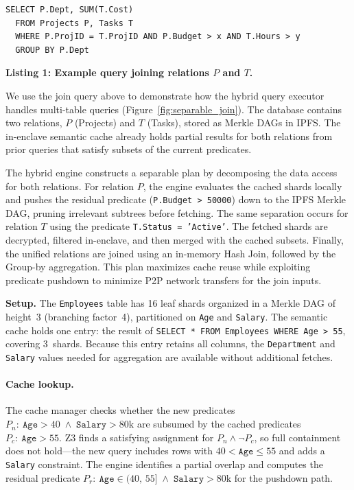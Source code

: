 \begin{lstlisting}[breaklines=true, basicstyle=\ttfamily\small]
  SELECT P.Dept, SUM(T.Cost)
  FROM Projects P, Tasks T
  WHERE P.ProjID = T.ProjID AND P.Budget > x AND T.Hours > y
  GROUP BY P.Dept
\end{lstlisting}
\textbf{Listing 1: Example query joining relations $P$ and $T$.}

We use the join query above to demonstrate how the hybrid query executor handles multi-table queries (Figure~\ref{fig:separable_join}). The database contains two relations, $P$ (Projects) and $T$ (Tasks), stored as Merkle DAGs in IPFS. The in-enclave semantic cache already holds partial results for both relations from prior queries that satisfy subsets of the current predicates. 

The hybrid engine constructs a separable plan by decomposing the data access for both relations. For relation $P$, the engine evaluates the cached shards locally and pushes the residual predicate (\texttt{P.Budget > 50000}) down to the IPFS Merkle DAG, pruning irrelevant subtrees before fetching. The same separation occurs for relation $T$ using the predicate \texttt{T.Status = 'Active'}. The fetched shards are decrypted, filtered in-enclave, and then merged with the cached subsets. Finally, the unified relations are joined using an in-memory Hash Join, followed by the Group-by aggregation. This plan maximizes cache reuse while exploiting predicate pushdown to minimize P2P network transfers for the join inputs.

\noindent
\textbf{Setup.}  The \texttt{Employees} table has 16 leaf shards
organized in a Merkle DAG of height~3 (branching factor~4),
partitioned on \texttt{Age} and \texttt{Salary}.  The semantic cache
holds one entry: the result of
\texttt{SELECT * FROM Employees WHERE Age > 55}, covering 3~shards.
Because this entry retains all columns, the \texttt{Department} and
\texttt{Salary} values needed for aggregation are available without
additional fetches.

\paragraph{Cache lookup.}
The cache manager checks whether the new predicates
$P_n\!:\ \texttt{Age} > 40 \;\wedge\; \texttt{Salary} > 80\text{k}$
are subsumed by the cached predicates
$P_c\!:\ \texttt{Age} > 55$.
Z3 finds a satisfying assignment for $P_n \wedge \neg P_c$, so full
containment does not hold---the new query includes rows with
$40 < \texttt{Age} \le 55$ and adds a \texttt{Salary} constraint.
The engine identifies a partial overlap and computes the residual
predicate
$P_r\!:\ \texttt{Age} \in (40,\, 55] \;\wedge\; \texttt{Salary} >
80\text{k}$
for the pushdown path.

